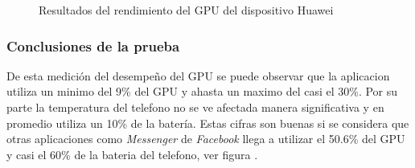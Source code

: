 \begin{figure}
   
  \caption{Resultados del rendimiento del GPU del dispositivo Huawei}
  \label{fig:GPUHuawei}
\end{figure} 

\subsubsection{Conclusiones de la prueba}
De esta medición del desempeño del GPU se puede observar que la aplicacion utiliza un minimo del 9\% del GPU y ahasta un maximo del casi el 30\%. Por su parte la temperatura del telefono no se ve afectada manera significativa y en promedio utiliza un 10\% de la batería. Estas cifras son buenas si se considera que otras aplicaciones como \textit{Messenger} de \textit{Facebook} llega a utilizar el 50.6\% del GPU y casi el 60\% de la bateria del telefono, ver figura . 